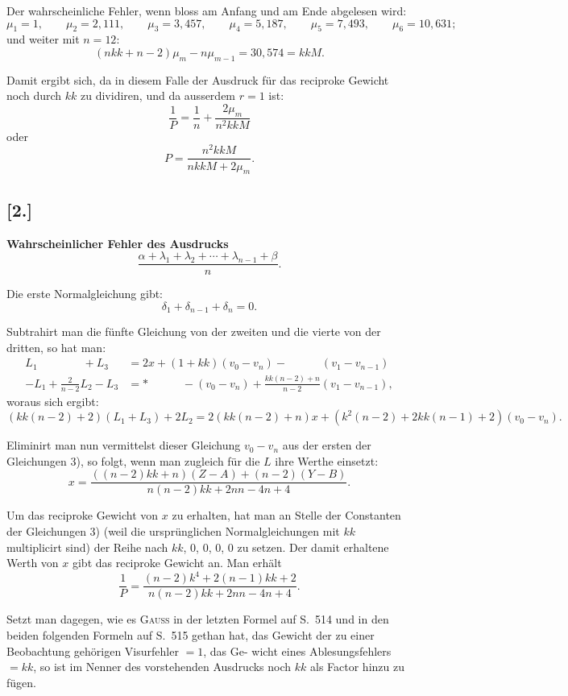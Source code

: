 \documentclass[12pt,a4paper]{article}
\theoremstyle{plain}
\theoremstyle{definition}
\theoremstyle{remark}
\begin{document}
\medskip
\noindent
Der wahrscheinliche Fehler, wenn bloss am Anfang und am Ende abgelesen wird:
\[\mu_1 = 1, \qquad \mu_2 = 2{,}111, \qquad \mu_3 = 3{,}457, \qquad \mu_4 = 5{,}187, \qquad \mu_5 = 7{,}493, \qquad \mu_6 = 10{,}631;\]
und weiter mit $n = 12$:
\[(nkk + n - 2)\mu_m - n\mu_{m-1} = 30{,}574 = kkM.\]

\medskip
\noindent
Damit ergibt sich, da in diesem Falle der Ausdruck für das reciproke Gewicht noch durch $kk$ zu
dividiren, und da ausserdem $r = 1$ ist:
\[\frac{1}{P} = \frac{1}{n} + \frac{2\mu_m}{n^2 kkM}\]
oder
\[P = \frac{n^2 kkM}{nkkM + 2\mu_m}.\]

\newpage
\subsection*{[2.]}

\textbf{Wahrscheinlicher Fehler des Ausdrucks}
\[\frac{\alpha + \lambda_1 + \lambda_2 + \cdots + \lambda_{n-1} + \beta}{n}.\]

\medskip
\noindent
Die erste Normalgleichung gibt:
\[\delta_1 + \delta_{n-1} + \delta_n = 0.\]

\medskip
\noindent
Subtrahirt man die fünfte Gleichung von der zweiten und die vierte von der dritten, so hat man:
\begin{align*}
L_1 \qquad\qquad + L_3 &= 2x + (1+kk)(v_0 - v_n) - \qquad\quad (v_1 - v_{n-1}) \\
-L_1 + \frac{2}{n-2}L_2 - L_3 &= * \qquad\quad - (v_0 - v_n) + \frac{kk(n-2)+n}{n-2}(v_1 - v_{n-1}),
\end{align*}
woraus sich ergibt:
\[(kk(n-2)+2)(L_1+L_3) + 2L_2 = 2(kk(n-2)+n)x + (k^2(n-2)+2kk(n-1)+2)(v_0-v_n).\]

\medskip
\noindent
Eliminirt man nun vermittelst dieser Gleichung $v_0 - v_n$ aus der ersten der Gleichungen 3), so folgt,
wenn man zugleich für die $L$ ihre Werthe einsetzt:
\[x = \frac{((n-2)kk+n)(Z-A) + (n-2)(Y-B)}{n(n-2)kk + 2nn - 4n + 4}.\]

\medskip
\noindent
Um das reciproke Gewicht von $x$ zu erhalten, hat man an Stelle der Constanten der Gleichungen 3)
(weil die ursprünglichen Normalgleichungen mit $kk$ multiplicirt sind) der Reihe nach $kk$, $0$, $0$, $0$, $0$ zu setzen.
Der damit erhaltene Werth von $x$ gibt das reciproke Gewicht an. Man erhält
\[\frac{1}{P} = \frac{(n-2)k^4 + 2(n-1)kk + 2}{n(n-2)kk + 2nn - 4n + 4}.\]

\medskip
\noindent
Setzt man dagegen, wie es \textsc{Gauss} in der letzten Formel auf S.\ 514 und in den beiden folgenden
Formeln auf S.\ 515 gethan hat, das Gewicht der zu einer Beobachtung gehörigen Visurfehler $=1$, das Ge-
wicht eines Ablesungsfehlers $= kk$, so ist im Nenner des vorstehenden Ausdrucks noch $kk$ als Factor hinzu
zu fügen.
\end{document}
